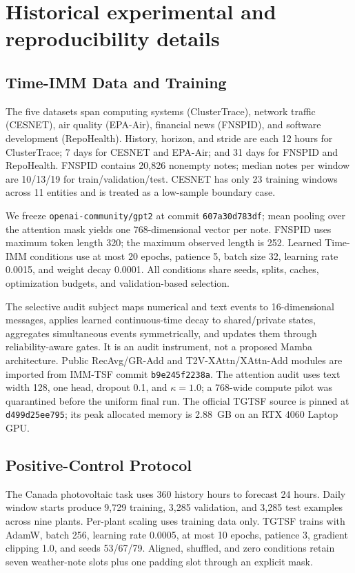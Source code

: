 

\section{Historical experimental and reproducibility details}
\label{app:setup}

\subsection{Time-IMM Data and Training}

The five datasets span computing systems (ClusterTrace), network traffic (CESNET), air quality (EPA-Air), financial news (FNSPID), and software development (RepoHealth). History, horizon, and stride are each 12 hours for ClusterTrace; 7 days for CESNET and EPA-Air; and 31 days for FNSPID and RepoHealth. FNSPID contains 20,826 nonempty notes; median notes per window are 10/13/19 for train/validation/test. CESNET has only 23 training windows across 11 entities and is treated as a low-sample boundary case.

We freeze \texttt{openai-community/gpt2} at commit \texttt{607a30d783df}; mean pooling over the attention mask yields one 768-dimensional vector per note. FNSPID uses maximum token length 320; the maximum observed length is 252. Learned Time-IMM conditions use at most 20 epochs, patience 5, batch size 32, learning rate 0.0015, and weight decay 0.0001. All conditions share seeds, splits, caches, optimization budgets, and validation-based selection.

The selective audit subject maps numerical and text events to 16-dimensional messages, applies learned continuous-time decay to shared/private states, aggregates simultaneous events symmetrically, and updates them through reliability-aware gates. It is an audit instrument, not a proposed Mamba architecture. Public RecAvg/GR-Add and T2V-XAttn/XAttn-Add modules are imported from IMM-TSF commit \texttt{b9e245f2238a}. The attention audit uses text width 128, one head, dropout 0.1, and $\kappa=1.0$; a 768-wide compute pilot was quarantined before the uniform final run. The official TGTSF source is pinned at \texttt{d499d25ee795}; its peak allocated memory is 2.88~GB on an RTX 4060 Laptop GPU.

\subsection{Positive-Control Protocol}

The Canada photovoltaic task uses 360 history hours to forecast 24 hours. Daily window starts produce 9,729 training, 3,285 validation, and 3,285 test examples across nine plants. Per-plant scaling uses training data only. TGTSF trains with AdamW, batch 256, learning rate 0.0005, at most 10 epochs, patience 3, gradient clipping 1.0, and seeds 53/67/79. Aligned, shuffled, and zero conditions retain seven weather-note slots plus one padding slot through an explicit mask.

